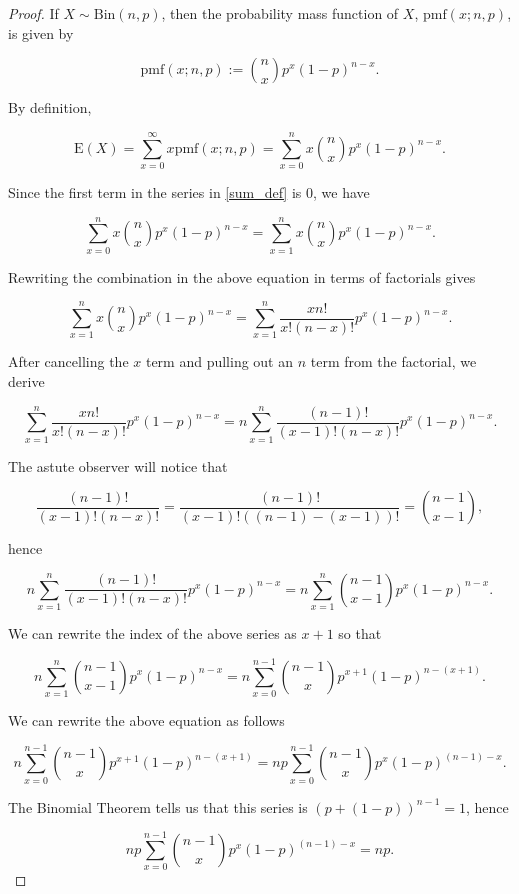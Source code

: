 \documentclass[12pt]{article}
\theoremstyle{definition}
\newcommand{\E}{\text{E}}
\newcommand{\pmf}{\text{pmf}}
\begin{document}
\begin{proof}
  If $X \sim \text{Bin}(n, p)$, then the probability mass function of
  $X$, $\pmf(x; n, p)$, is given by

  \[
    \pmf(x; n, p) := {n \choose x} p^x (1 - p)^{n-x}.
  \]

  By definition,

  \begin{equation}\label{sum_def}
    \E(X) = \sum_{x=0}^{\infty} x \pmf(x; n, p) = \sum_{x=0}^{n} x {n \choose x} p^x (1-p)^{n-x}.
  \end{equation}

  Since the first term in the series in \eqref{sum_def} is 0, we have

  \[
    \sum_{x=0}^{n} x {n \choose x} p^x (1-p)^{n-x} = \sum_{x=1}^{n} x {n \choose x} p^x (1-p)^{n-x}.
  \]

  Rewriting the combination in the above equation in terms of factorials gives

  \[
    \sum_{x=1}^{n} x {n \choose x} p^x (1-p)^{n-x} = \sum_{x=1}^{n} \frac{xn!}{x!(n-x)!} p^x (1-p)^{n-x}.
  \]

  After cancelling the $x$ term and pulling out an $n$ term from the factorial, we derive

  \[
    \sum_{x=1}^{n} \frac{xn!}{x!(n-x)!} p^x (1-p)^{n-x} = n \sum_{x=1}^{n} \frac{(n-1)!}{(x-1)!(n-x)!} p^x (1-p)^{n-x}.
  \]

  The astute observer will notice that

  \[
    \frac{(n-1)!}{(x-1)!(n-x)!} = \frac{(n-1)!}{(x-1)!((n - 1) - (x - 1))!} = {n-1 \choose x-1},
  \]

  hence

  \[
    n \sum_{x=1}^{n} \frac{(n-1)!}{(x-1)!(n-x)!} p^x (1-p)^{n-x} = n \sum_{x=1}^{n} {n-1 \choose x-1} p^x (1-p)^{n-x}.
  \]

  We can rewrite the index of the above series as $x + 1$ so that

  \[
    n \sum_{x=1}^{n} {n-1 \choose x-1} p^x (1-p)^{n-x} = n \sum_{x=0}^{n - 1} {n-1 \choose x} p^{x+1} (1-p)^{n-(x+1)}.
  \]

  We can rewrite the above equation as follows

  \[
    n \sum_{x=0}^{n - 1} {n-1 \choose x} p^{x+1} (1-p)^{n-(x+1)} = np \sum_{x=0}^{n - 1} {n-1 \choose x} p^{x} (1-p)^{(n-1)-x}.
  \]

  The Binomial Theorem tells us that this series is $(p + (1 - p))^{n-1} = 1$, hence

  \begin{equation}\label{sum_calc}
    np \sum_{x=0}^{n - 1} {n-1 \choose x} p^{x} (1-p)^{(n-1)-x} = np.
  \end{equation}


\end{proof}
\end{document}
